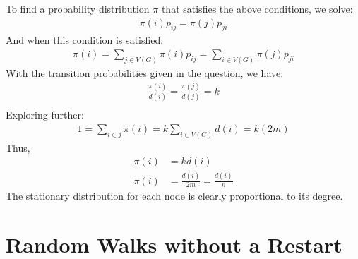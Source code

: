 \documentclass{assignment}
\begin{document}
To find a probability distribution $\pi$ that satisfies the above conditions, we solve:
\begin{align*}
    \pi(i)p_{ij} = \pi(j)p_{ji}
\end{align*}
And when this condition is satisfied:
\begin{align*}
    \pi(i) = \sum_{j \in V(G)} \pi(i) p_{ij} = \sum_{i \in V(G)} \pi(j) p_{ji}
\end{align*}
With the transition probabilities given in the question, we have:
\begin{align*}
    \frac{\pi(i)}{d(i)} = \frac{\pi(j)}{d(j)} = k \\ 
\end{align*}
Exploring further:
\begin{align*}
    1 = \sum_{i \in j} \pi(i) = k \sum_{i \in V(G)} d(i) = k(2m)
\end{align*}
Thus,
\begin{align*}
    \pi(i) &= k d(i) \\
    \pi(i) &= \frac{d(i)}{2m} = \frac{d(i)}{n}
\end{align*}
The stationary distribution for each node is clearly proportional to its degree.

\section{Random Walks without a Restart}
\end{document}
